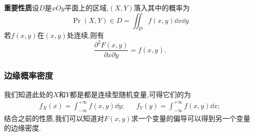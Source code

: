 \textbf{重要性质}\quad 设$D$是$xOy$平面上的区域,$(X,Y )$落入其中的概率为
\begin{equation}
    \Pr{(X,Y)\in D} = \iint_D f(x,y)\dd{x}\dd{y}
\end{equation}
若$f(x,y)$在$(x,y )$处连续,则有
\begin{equation}
    \frac{\partial^2 F(x,y)}{\partial x\partial y} = f(x,y).
\end{equation}
\subsubsection{边缘概率密度}\label{sec:marginPDF}
我们知道此处的$X$和$Y$都是都是连续型随机变量,可得它们的为
\begin{align}
    f_X(x)=\int_{-\infty}^{+\infty}f(x,y )\dd y; &  & f_Y(y)=\int_{-\infty}^{+\infty}f(x,y )\dd x;
    \label{eq:3.12}
\end{align}
结合之前的性质,我们可以知道对$F(x,y)$求一个变量的偏导可以得到另一个变量的边缘密度.
